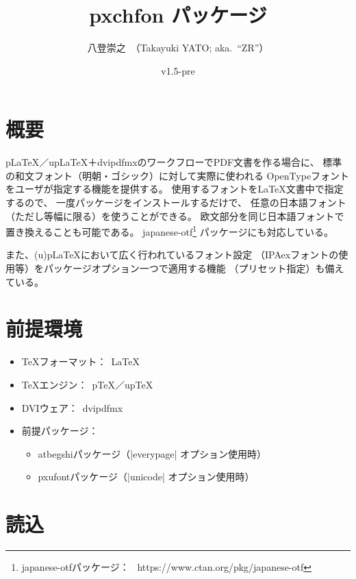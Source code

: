 \documentclass[uplatex,dvipdfmx,a4paper]{jsarticle}
\newcommand{\PkgVersion}{1.5-pre}
\newcommand{\PkgDate}{2019/05/01}
\newcommand{\Pkg}[1]{\textsf{#1}}
\newcommand{\Means}{：\ }
\providecommand{\pTeX}{p\TeX}
\providecommand{\pLaTeX}{p\LaTeX}
\providecommand{\upTeX}{u\pTeX}
\providecommand{\upLaTeX}{u\pLaTeX}
\begin{document}
\title{\Pkg{pxchfon} パッケージ}
\author{八登崇之\ （Takayuki YATO; aka.~``ZR''）}
\date{v\PkgVersion\quad[\PkgDate]}
\maketitle
\tableofcontents

\section{概要}

{\pLaTeX}／{\upLaTeX}＋dvipdfmxのワークフローでPDF文書を作る場合に、
標準の和文フォント（明朝・ゴシック）に対して実際に使われる
OpenTypeフォントをユーザが指定する機能を提供する。
使用するフォントを{\LaTeX}文書中で指定するので、
一度パッケージをインストールするだけで、
任意の日本語フォント（ただし等幅に限る）を使うことができる。
欧文部分を同じ日本語フォントで置き換えることも可能である。
\Pkg{japanese-otf}\footnote{\Pkg{japanese-otf}パッケージ\Means
  https://www.ctan.org/pkg/japanese-otf}%
パッケージにも対応している。

また、{(u)\pLaTeX}において広く行われているフォント設定
（IPAexフォントの使用等）をパッケージオプション一つで適用する機能
（プリセット指定）も備えている。

\section{前提環境}

\begin{itemize}
\item {\TeX}フォーマット\Means {\LaTeX}
\item {\TeX}エンジン\Means {\pTeX}／{\upTeX}
\item DVIウェア\Means dvipdfmx
\item 前提パッケージ\Means
  \begin{itemize}
  \item \Pkg{atbegshi}パッケージ（|everypage| オプション使用時）
  \item \Pkg{pxufont}パッケージ（|unicode| オプション使用時）
  \end{itemize}
\end{itemize}

\section{読込}
\label{sec:Loading}
\end{document}

